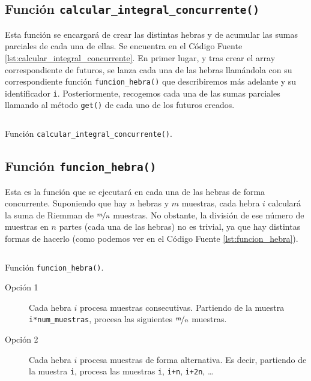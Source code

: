 \documentclass[12pt]{book}
\begin{document}
    \subsection{Función \texttt{calcular_integral_concurrente()}}

    Esta función se encargará de crear las distintas hebras y de acumular las sumas parciales de cada una de ellas. Se encuentra en el Código Fuente \ref{lst:calcular_integral_concurrente}.
    En primer lugar, y tras crear el array correspondiente de futuros, se lanza cada una de las hebras llamándola con su correspondiente función \texttt{funcion_hebra()} que describiremos más adelante y su identificador \verb|i|.
    Posteriormente, recogemos cada una de las sumas parciales llamando al método \texttt{get()} de cada uno de los futuros creados.
    \begin{listing}
        \inputminted[firstline=89, lastline=103]{c++}{./Seminario1/Código/Integracion.cpp}
        \caption{Función \texttt{calcular_integral_concurrente()}.}
        \label{lst:calcular_integral_concurrente}
    \end{listing}

    \subsection{Función \texttt{funcion_hebra()}}

    Esta es la función que se ejecutará en cada una de las hebras de forma concurrente.
    Suponiendo que hay $n$ hebras y $m$ muestras, cada hebra $i$ calculará la suma de Riemman de $\nicefrac{m}{n}$ muestras.
    No obstante, la división de ese número de muestras en $n$ partes (cada una de las hebras) no es trivial, ya que hay distintas formas de hacerlo
    (como podemos ver en el Código Fuente \ref{lst:funcion_hebra}).
    \begin{listing}
        \inputminted[firstline=62, lastline=82]{c++}{./Seminario1/Código/Integracion.cpp}
        \caption{Función \texttt{funcion_hebra()}.}
        \label{lst:funcion_hebra}
    \end{listing}
    \begin{description}
        \item[Opción 1] Cada hebra $i$ procesa muestras consecutivas.
        Partiendo de la muestra \texttt{i*num_muestras}, procesa las siguientes $\nicefrac{m}{n}$ muestras.

        \item[Opción 2] Cada hebra $i$ procesa muestras de forma alternativa.
        Es decir, partiendo de la muestra \texttt{i}, procesa las muestras \texttt{i}, \texttt{i+n}, \texttt{i+2n}, \ldots
    \end{description}
\end{document}
